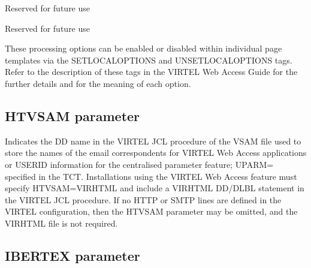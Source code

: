 \documentclass[letterpaper,10pt,english]{sphinxmanual}
\begin{document}
\sphinxAtStartPar
{} \sphinxhyphen{} Reserved for future use

\sphinxAtStartPar
{} \sphinxhyphen{} Reserved for future use

\sphinxAtStartPar
These processing options can be enabled or disabled within individual page templates via the SET\sphinxhyphen{}LOCAL\sphinxhyphen{}OPTIONS and UNSET\sphinxhyphen{}LOCAL\sphinxhyphen{}OPTIONS tags. Refer to the description of these tags in the VIRTEL Web Access Guide for the further details and for the meaning of each option.

\ignorespaces 

\subsection{HTVSAM parameter}
\label{\detokenize{Installation_Guide:htvsam-parameter}}\label{\detokenize{Installation_Guide:index-81}}
\begin{sphinxVerbatim}[commandchars=\\\{\}]
                      
\end{sphinxVerbatim}

\sphinxAtStartPar
{} \sphinxhyphen{} Indicates the DD name in the VIRTEL JCL procedure of the VSAM file used to store the names of the e\sphinxhyphen{}mail correspondents for VIRTEL Web Access applications or USERID information for the centralised parameter feature; UPARM= specified in the TCT. Installations using the VIRTEL Web Access feature must specify HTVSAM=VIRHTML and include a VIRHTML DD/DLBL statement in the VIRTEL JCL procedure. If no HTTP or SMTP lines are defined in the VIRTEL configuration, then the HTVSAM parameter may be omitted, and the VIRHTML file is not required.

\ignorespaces 

\subsection{IBERTEX parameter}
\label{\detokenize{Installation_Guide:ibertex-parameter}}\label{\detokenize{Installation_Guide:index-82}}
\begin{sphinxVerbatim}[commandchars=\\\{\}]
                      
\end{sphinxVerbatim}
\end{document}

